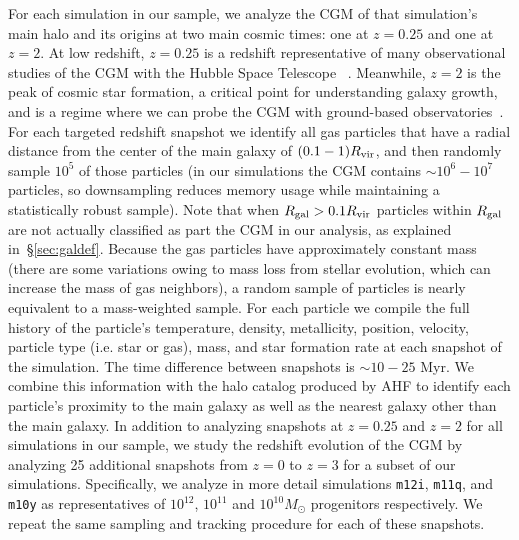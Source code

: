 \documentclass[fleqn,usenatbib]{mnras}
\begin{document}
For each simulation in our sample, we analyze the CGM of that simulation's main halo and its origins at two main cosmic times: one at $z=0.25$ and one at $z=2$.
At low redshift, $z=0.25$ is a redshift representative of many observational studies of the CGM with the Hubble Space Telescope ~\citep[e.g.][]{Lehner2013, Tumlinson2013,Werk2014,Stocke2014,Prochaska2017,Chen2018}.
Meanwhile, $z=2$ is the peak of cosmic star formation, a critical point for understanding galaxy growth, and is a regime where we can probe the CGM with ground-based observatories~\citep[e.g.][]{2006ApJ...637..648S,Steidel2010,Rudie2012,OMeara2013}.
For each targeted redshift snapshot we identify all gas particles that have a radial distance from the center of the main galaxy of $(0.1-1) R_{\rm vir}$, and then randomly sample $10^5$ of those particles (in our simulations the CGM contains $\sim 10^6 - 10^7$ particles, so downsampling reduces memory usage while maintaining a statistically robust sample).
Note that when $R_{\rm gal} > 0.1 R_{\rm vir}$ particles within $R_{\rm gal}$ are not actually classified as part the CGM in our analysis, as explained in~\S\ref{sec:galdef}. 
Because the gas particles have approximately constant mass (there are some variations owing to mass loss from stellar evolution, which can increase the mass of gas neighbors), a random sample of particles is nearly equivalent to a mass-weighted sample.
For each particle we compile the full history of the particle's temperature, density, metallicity, position, velocity, particle type (i.e. star or gas), mass, and star formation rate at each snapshot of the simulation.
The time difference between snapshots is $\sim 10-25$ Myr.
We combine this information with the halo catalog produced by AHF to identify each particle's proximity to the main galaxy as well as the nearest galaxy other than the main galaxy.
In addition to analyzing snapshots at $z=0.25$ and $z=2$ for all simulations in our sample, we study the redshift evolution of the CGM by analyzing 25 additional snapshots from $z=0$ to $z=3$ for a subset of our simulations.
Specifically, we analyze in more detail simulations \texttt{m12i}, \texttt{m11q}, and \texttt{m10y} as representatives of $10^{12}$, $10^{11}$ and $10^{10} M_\odot$ progenitors respectively.
We repeat the same sampling and tracking procedure for each of these snapshots.
\end{document}
